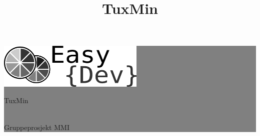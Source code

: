 \setlength{\oddsidemargin}{0mm} %
\setlength{\evensidemargin}{0mm} %

\newcommand{\HRule}[1]{\hfill \rule{0.2\linewidth}{#1}} %



\thispagestyle{empty} %

\vspace*{-5cm}
\hspace*{9.6cm}
\colorbox{grey}{

	\parbox[]{0.35\linewidth}{
		\centering 
		\fontsize{50pt}{80pt}\selectfont %
		\vspace*{19cm} %
		
		\hspace*{-2.4cm}
		\includegraphics[width=70mm]{./img/fremside/logo.png}
		\\
		\vspace*{0.35cm}
		 
		\fontsize{30pt}{50pt}\selectfont 
		{\selectfont 
		\hfill
		TuxMin
		\title{TuxMin}
		}
		\fontsize{10pt}{0pt}\selectfont 
		{\selectfont 
		\\
		\hfill
		Gruppeprosjekt MMI 
		}
		\par
		
		\vspace*{0.5cm} %
	}
}

